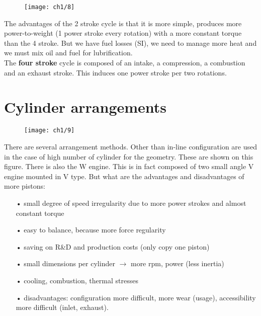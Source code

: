 		\begin{wrapfigure}[10]{r}{6cm}
		\vspace{-5mm}
		\texttt{[image: ch1/8]}
		\label{fig:1.8}
		\end{wrapfigure}
		The advantages of the 2 stroke cycle is that it is more simple, produces more power-to-weight (1 power stroke every rotation) with a more constant torque than the 4 stroke. But we have fuel losses (SI), we need to manage more heat and we must mix oil and fuel for lubrification. \\
		
		The \textbf{four stroke} cycle is composed of an intake, a compression, a combustion and an exhaust stroke. This induces one power stroke per two rotations.  
		
		\section{Cylinder arrangements}
			\begin{wrapfigure}[13]{l}{8cm}
			\vspace{-5mm}
			\texttt{[image: ch1/9]}
			\end{wrapfigure}
			There are several arrangement methods. Other than in-line configuration are used in the case of high number of cylinder for the geometry. These are shown on this figure. There is also the W engine. This is in fact composed of two small angle V engine mounted in V type. But what are the advantages and disadvantages of more pistons:
			
			\begin{itemize}
				\item[•] small degree of speed irregularity due to more power strokes and almost constant torque
				\item[•] easy to balance, because more force regularity
				\item[•] saving on R\&D and production costs (only copy one piston)
				\item[•] small dimensions per cylinder $\rightarrow$ more rpm, power (less inertia)
				\item[•] cooling, combustion, thermal stresses
				\item[•] disadvantages: configuration more difficult, more wear (usage), accessibility more difficult (inlet, exhaust).
			\end{itemize}
			
